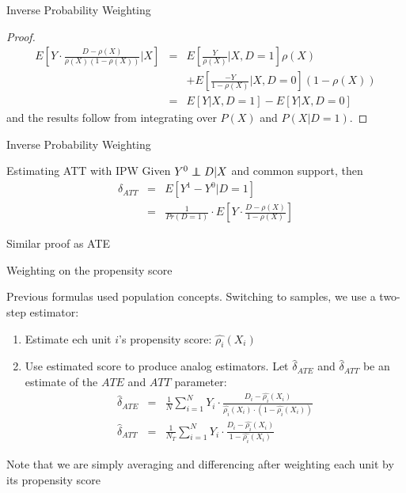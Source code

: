 \documentclass{beamer}
\newcommand\independent{\protect\mathpalette{\protect\independenT}{\perp}}
\def\independenT#1#2{\mathrel{\rlap{$#1#2$}\mkern2mu{#1#2}}}
\begin{document}
\begin{frame}{Inverse Probability Weighting}

	\begin{proof}
	\begin{eqnarray*}
	E \left[ Y \cdot \frac{D-\rho(X)}{\rho(X)(1-\rho(X))} \Big\vert X \right] &=& E \left[ \frac{Y}{\rho(X)} \Big\vert X,D=1 \right] \rho(X) \\
	&& + E\left[ \frac{-Y}{1-\rho(X)} \Big\vert X,D=0 \right](1-\rho(X)) \\
	&=& E[Y|X,D=1] - E[Y|X,D=0]
	\end{eqnarray*}and the results follow from integrating over $P(X)$ and $P(X|D=1)$.
	\end{proof}

\end{frame}

\begin{frame}{Inverse Probability Weighting}
	
		\begin{block}{Estimating ATT with IPW}
	Given $Y^0 \independent{D}|X$ and common support, then
		\begin{eqnarray*}
		\delta_{ATT}&=&E[Y^1-Y^0|D=1] \\
		&=& \frac{1}{Pr(D=1)} \cdot  E \left[ Y \cdot \frac{D-\rho(X)}{1-\rho(X)} \right]
		\end{eqnarray*}
	\end{block}Similar proof as ATE

\end{frame}



\begin{frame}{Weighting on the propensity score}

Previous formulas used population concepts. Switching to samples, we use a two-step estimator:
	\begin{enumerate}
	\item Estimate ech unit $i$'s propensity score: $\widehat{\rho_i}(X_i)$
	\item Use estimated score to produce analog estimators. Let $\widehat{\delta}_{ATE}$ and $\widehat{\delta}_{ATT}$  be an estimate of the $ATE$ and $ATT$ parameter:
		\begin{eqnarray*}
		\widehat{\delta}_{ATE} &=& \frac{1}{N} \sum_{i=1}^N Y_i \cdot \frac{D_i - \widehat{\rho_i}(X_i)}{\widehat{\rho_i}(X_i) \cdot (1-\widehat{\rho_i}(X_i))}\\
		\widehat{\delta}_{ATT} &=& \frac{1}{N_T} \sum_{i=1}^N Y_i \cdot \frac{D_i - \widehat{\rho_i}(X_i)}{1-\widehat{\rho_i}(X_i)}
		\end{eqnarray*}
	\end{enumerate}Note that we are simply averaging and differencing after weighting each unit by its propensity score
\end{frame}
\end{document}
